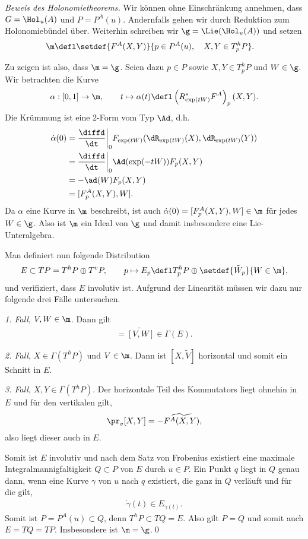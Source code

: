 \documentclass[%
	paper=a5,%
	fleqn,%
	DIV=18,%
	BCOR=0mm,
	fontsize=11pt,
	titlepage=false,%
	bibliography=totoc,
	DIV=18,%
	twoside=true,
	pdftitle=Riemannsche Geometrie,
	pdfauthor=Uwe Semmelmann,
	numbers=noendperiod]%
	{scrbook}
\begin{document}
\begin{proof}[Beweis des Holonomietheorems]
Wir können ohne Einschränkung annehmen, dass $G=\Hol_{u}(A)$ und $P=P^A(u)$. Andernfalls gehen wir durch Reduktion zum Holonomiebündel über. Weiterhin schreiben wir $\g = \Lie(\Hol_{u}(A))$ und setzen
\begin{align*}
\m \defl \span\setdef{F^A(X,Y)}{p\in P^A(u),\quad X,Y\in T_{p}^hP}.
\end{align*}

Zu zeigen ist also, dass $\m = \g$. Seien dazu $p\in P$ sowie $X,Y\in T^h_{p}P$ und $W\in \g$. Wir betrachten die Kurve
\begin{align*}
\alpha: [0,1] \to \m,\qquad t\mapsto \alpha(t) \defl \left(R_{\exp(tW)}^* F^A\right)_{p}(X,Y).
\end{align*}
Die Krümmung ist eine 2-Form vom Typ $\Ad$, d.h.
\begin{align*}
\dot{\alpha}(0) &=  \frac{\diffd}{\dt}\bigg|_{0} F_{\exp(tW)}(\dR_{\exp(tW)}(X),\dR_{\exp(tW)}(Y))\\
&= \frac{\diffd}{\dt}\bigg|_{0} \Ad(\exp(-tW))F_{p}(X,Y)\\
&= -\ad(W) F_{p}(X,Y)\\
&= [F_{p}^A(X,Y),W].
\end{align*}
Da $\alpha$ eine Kurve in $\m$ beschreibt, ist auch $\dot{\alpha}(0)=[F_{p}^A(X,Y),W]\in\m$ für jedes $W\in\g$. Also ist $\m$ ein Ideal von $\g$ und damit insbesondere eine Lie-Unteralgebra.

Man definiert nun folgende Distribution
\begin{align*}
E \subset TP = T^hP\oplus T^vP,\qquad 
p\mapsto E_{p}\defl T_{p}^hP\oplus \setdef{\tilde{W}_{p}}{W\in \m},
\end{align*}
und verifiziert, dass $E$ involutiv ist. Aufgrund der Linearität müssen wir dazu nur folgende drei Fälle untersuchen.

\textit{1. Fall}, $V,W\in \m$. Dann gilt
\begin{align*}
[\tilde{V},\tilde{W}] = \widetilde{[V,W]} \in \Gamma(E).
\end{align*}

\textit{2. Fall}, $X\in \Gamma(T^hP)$ und $V\in \m$. Dann ist $[X,\tilde{V}]$ horizontal und somit ein Schnitt in $E$.

\textit{3. Fall}, $X,Y\in \Gamma(T^hP)$. Der horizontale Teil des Kommutators liegt ohnehin in $E$ und für den vertikalen gilt,
\begin{align*}
\pr_{v}[X,Y] = - \widetilde{F^A(X,Y)},
\end{align*}
also liegt dieser auch in $E$.

Somit ist $E$ involutiv und nach dem Satz von Frobenius existiert eine maximale Integralmannigfaltigkeit $Q\subset P$ von $E$ durch $u\in P$.
Ein Punkt $q$ liegt in $Q$ genau dann, wenn eine Kurve $\gamma$ von $u$ nach $q$ existiert, die ganz in $Q$  verläuft und für die gilt,
\begin{align*}
\dot{\gamma}(t) \in E_{\gamma(t)}.
\end{align*}
Somit ist $P=P^A(u)\subset Q$, denn $T^hP\subset TQ=E$. Also gilt $P=Q$ und somit auch $E=TQ=TP$. Insbesondere ist $\m = \g$.\qed
\end{proof}
\end{document}
